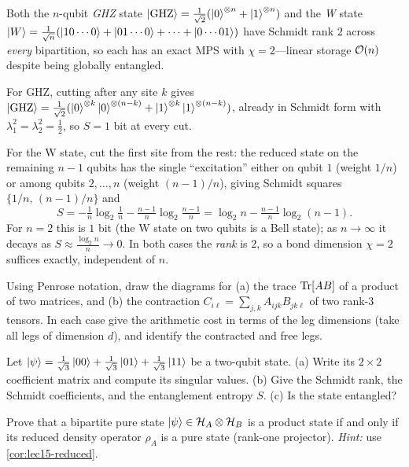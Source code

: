 \begin{example}[GHZ and W states: $\chi=2$ everywhere]\label{exa:lec15-ghzw}
Both the $n$-qubit \emph{GHZ} state
$\ket{\mathrm{GHZ}}=\tfrac1{\sqrt2}(\ket{0}^{\otimes n}+\ket{1}^{\otimes n})$ and
the \emph{W} state $\ket{W}=\tfrac1{\sqrt n}(\ket{10\cdots0}+\ket{01\cdots0}+\cdots+\ket{0\cdots01})$
have Schmidt rank $2$ across \emph{every} bipartition, so each has an exact MPS
with $\chi=2$---linear storage $\mathcal{O}(n)$ despite being globally entangled.

For GHZ, cutting after any site $k$ gives
$\ket{\mathrm{GHZ}}=\tfrac1{\sqrt2}(\ket{0}^{\otimes k}\ket{0}^{\otimes(n-k)}
+\ket{1}^{\otimes k}\ket{1}^{\otimes(n-k)})$, already in Schmidt form with
$\lambda_1^{2}=\lambda_2^{2}=\tfrac12$, so $S=1$ bit at every cut.

For the W state, cut the first site from the rest: the reduced state on the
remaining $n-1$ qubits has the single ``excitation'' either on qubit $1$ (weight
$1/n$) or among qubits $2,\dots,n$ (weight $(n-1)/n$), giving Schmidt squares
$\{1/n,\,(n-1)/n\}$ and
\[
  S=-\tfrac1n\log_2\tfrac1n-\tfrac{n-1}{n}\log_2\tfrac{n-1}{n}
   =\log_2 n-\tfrac{n-1}{n}\log_2(n-1).
\]
For $n=2$ this is $1$ bit (the W state on two qubits is a Bell state); as
$n\to\infty$ it decays as $S\approx\tfrac{\log_2 n}{n}\to0$. In both cases the
\emph{rank} is $2$, so a bond dimension $\chi=2$ suffices exactly, independent of
$n$.
\end{example}

\exercisesection
\begin{exercise}\label{ex:lec15-1}
Using Penrose notation, draw the diagrams for (a) the trace $\operatorname{Tr}[AB]$ of a product
of two matrices, and (b) the contraction
$C_{i\ell}=\sum_{j,k}A_{ijk}B_{jk\ell}$ of two rank-$3$ tensors. In each case give
the arithmetic cost in terms of the leg dimensions (take all legs of dimension
$d$), and identify the contracted and free legs.
\end{exercise}

\begin{exercise}\label{ex:lec15-2}
Let $\ket{\psi}=\tfrac{1}{\sqrt3}\ket{00}+\tfrac{1}{\sqrt3}\ket{01}+\tfrac{1}{\sqrt3}\ket{11}$
be a two-qubit state. (a) Write its $2\times2$ coefficient matrix and compute its
singular values. (b) Give the Schmidt rank, the Schmidt coefficients, and the
entanglement entropy $S$. (c) Is the state entangled?
\end{exercise}

\begin{exercise}\label{ex:lec15-3}
Prove that a bipartite pure state $\ket{\psi}\in\mathcal{H}_A\otimes\mathcal{H}_B$ is a product
state if and only if its reduced density operator $\rho_A$ is a pure state
(rank-one projector). \emph{Hint:} use \cref{cor:lec15-reduced}.
\end{exercise}

